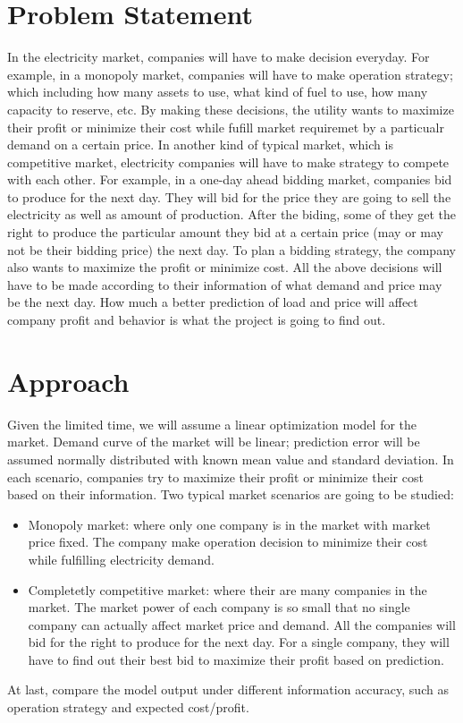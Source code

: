\documentclass[12pt,letterpaper]{article}
\theoremstyle{definition}
\begin{document}
\section{Problem Statement}
In the electricity market, companies will have to make decision everyday. For example, in a monopoly market, companies will have to make operation strategy; which including how many assets to use, what kind of fuel to use, how many capacity to reserve, etc. By making these decisions, the utility wants to maximize their profit or minimize their cost while fufill market requiremet by a particualr demand on a certain price. In another kind of typical market, which is competitive market, electricity companies will have to make strategy to compete with each other. For example, in a one-day ahead bidding market, companies bid to produce for the next day. They will bid for the price they are going to sell the electricity as well as amount of production.  After the biding, some of they get the right to produce the particular amount they bid at a certain price (may or may not be their bidding price) the next day. To plan a bidding strategy, the company also wants to maximize the profit or minimize cost. 
All the above decisions will have to be made according to their information of what demand and price may be the next day. How much a better prediction of load and price will affect company profit and behavior is what the project is going to find out.

\section{Approach}
Given the limited time, we will assume a linear optimization model for the market. Demand curve of the market will be linear; prediction error will be assumed normally distributed with known mean value and standard deviation. In each scenario, companies try to maximize their profit or minimize their cost based on their information. Two typical market scenarios are going to be studied: 
\begin{itemize}
\item Monopoly market: where only one company is in the market with market price fixed. The company make operation decision to minimize their cost while fulfilling electricity demand.
\item Completetly competitive market: where their are many companies in the market. The market power of each company is so small that no single company can actually affect market price and demand. All the companies will bid for the right to produce for the next day. For a single company, they will have to find out their best bid to maximize their profit based on prediction.
\end{itemize}
At last, compare the model output under different information accuracy, such as operation strategy and expected cost/profit.
\end{document}
